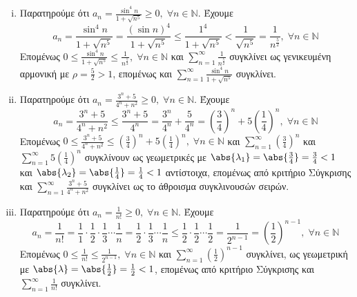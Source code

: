 \documentclass[a4paper,table]{report}
\begin{document}
\begin{enumerate}
\begin{enumerate}[i)]
      \item Παρατηρούμε ότι $ a_{n} = \frac{\sin^{4}{n}}{1+ \sqrt{n^{5}}} \geq 0, 
        \; \forall n \in \mathbb{N}$. Έχουμε
        \[
          a_{n} =  \frac{\sin^{4}{n}}{1+ \sqrt{n^{5}}} = \frac{(\sin{n} )^{4}}{1+
          \sqrt{n^{5}}} \leq \frac{1^{4}}{1+ \sqrt{n^{5}}} < 
          \frac{1}{\sqrt{n^{5}}} = \frac{1}{n^{\frac{5}{2}}}, \; 
          \forall n \in \mathbb{N}
        \] 
        Επομένως $ 0 \leq \frac{\sin^{4}{n}}{1 + \sqrt{n^{5}}} \leq
        \frac{1}{n^{\frac{5}{2}}}, \; \forall n \in \mathbb{N} $ και 
        $ \sum_{n=1}^{\infty} \frac{1}{n^{\frac{5}{2}}} $ συγκλίνει ως 
        γενικευμένη αρμονική με $ \rho = \frac{5}{2} > 1 $, επομένως και 
        $ \sum_{n=1}^{\infty} \frac{\sin^{4}{n}}{1 + \sqrt{n^{5}}} $ συγκλίνει.

      \item Παρατηρούμε ότι $ a_{n}= \frac{3^{n}+5}{4^{n}+n^{2}} \geq 0, 
        \; \forall n \in \mathbb{N}$. Έχουμε
        \[
          a_{n} = \frac{3^{n}+5}{4^{n}+n^{2}} \leq \frac{3^{n}+5}{4^{n}} = 
          \frac{3^{n}}{4^{n}} + \frac{5}{4^{n}} = 
          \left(\frac{3}{4}\right)^{n} + 5 \left(\frac{1}{4}\right)^{n} , \; 
          \forall n \in \mathbb{N}
        \] 
        Επομένως $ 0 \leq \frac{3^{n}+5}{4^{n}+n^{2}} \leq 
        \left(\frac{3}{4}\right)^{n} + 5 \left(\frac{1}{4}\right)^{n}, \; 
        \forall n \in \mathbb{N} $ και $ 
        \sum_{n=1}^{\infty} \left(\frac{3}{4} \right)^{n}  $ και $
        \sum_{n=1}^{\infty} 5 \left(\frac{1}{4} \right)^{n} $ 
        συγκλίνουν ως γεωμετρικές με 
        $ \abs{\lambda_{1}} = \abs{\frac{3}{4}} = \frac{3}{4} < 1 $ και 
        $ \abs{\lambda_{2}} = \abs{\frac{1}{4}} = \frac{1}{4} < 1 $ αντίστοιχα, 
        επομένως από κριτήριο Σύγκρισης και 
        $ \sum_{n=1}^{\infty} \frac{3^{n}+5}{4^{n}+n^{2}} $ 
        συγκλίνει ως το άθροισμα συγκλινουσών σειρών.

      \item Παρατηρούμε ότι $ a_{n} = \frac{1}{n!} \geq 0, \; \forall n \in 
        \mathbb{N} $. Έχουμε 
        \[
          a_{n}= \frac{1}{n!} = \frac{1}{1} \cdot \frac{1}{2} \cdot 
          \frac{1}{3} \cdots
          \frac{1}{n} = \frac{1}{2} \cdot \frac{1}{3} \cdots \frac{1}{n} \leq 
          \frac{1}{2} \cdot \frac{1}{2} \cdots \frac{1}{2} = \frac{1}{2^{n-1}} = 
          \left(\frac{1}{2} \right)^{n-1}, 
          \; \forall n \in \mathbb{N} 
        \] 
        Επομένως $ 0 \leq \frac{1}{n!} \leq \frac{1}{2^{n-1}}, \; \forall n \in 
        \mathbb{N} $ και $ \sum_{n=1}^{\infty} \left(\frac{1}{2} \right)^{n-1}  $ 
        συγκλίνει, ως γεωμετρική με $ \abs{\lambda} = \abs{\frac{1}{2}} = 
        \frac{1}{2} < 1 $, επομένως από κριτήριο Σύγκρισης και 
        $ \sum_{n=1}^{\infty} \frac{1}{n!} $ συγκλίνει.


\end{enumerate}
\end{enumerate}
\end{document}
